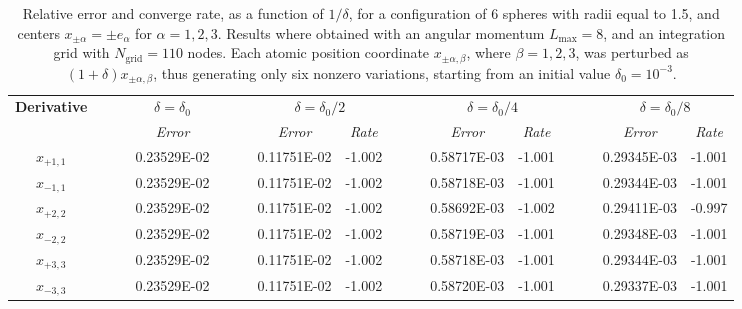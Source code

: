 \begin{table}[t]
\footnotesize
\begin{center}
	\begin{tabular}{ @{}cccc  cccc  cccc @{} }
\toprule[0.1em] 
\multirow{2}{*}{\bf Derivative} & $\phantom{abs}$ &  \multicolumn{1}{c}{$\delta = \delta_0$}& $\phantom{abs}$  & \multicolumn{2}{c}{$\delta = \delta_0/2$}& $\phantom{abs}$  & \multicolumn{2}{c}{$\delta = \delta_0/4$}& $\phantom{abs}$  & \multicolumn{2}{c}{$\delta = \delta_0/8$} \\
		         \cmidrule[0.05em]{3-3}  \cmidrule[0.05em](lr){5-6}  \cmidrule[0.05em]{8-9}   \cmidrule[0.05em]{11-12}
&	& {\sl Error}	&& {\sl Error}	& {\sl Rate} && {\sl Error}	& {\sl Rate}&& {\sl Error}	& {\sl Rate} \\
\midrule[0.05em]
$x_{+1,1}$ &  &  0.23529E-02  &  &    0.11751E-02  &  -1.002  &&  0.58717E-03  &  -1.001  &&  0.29345E-03  &  -1.001  \\
$x_ {-1,1}$  &&  0.23529E-02  &   &  0.11751E-02  &  -1.002  &&  0.58718E-03  &  -1.001  &&  0.29344E-03  &  -1.001  \\
$x_ {+2,2}$  &&  0.23529E-02  &   & 0.11751E-02  &  -1.002  &&  0.58692E-03  &  -1.002  &&  0.29411E-03  &  -0.997  \\
$x_ {-2,2}$  &&  0.23529E-02  &    &0.11751E-02  &  -1.002  &&  0.58719E-03  &  -1.001  &&  0.29348E-03  &  -1.001  \\
$x_ {+3,3}$  &&  0.23529E-02  &  &  0.11751E-02  &  -1.002  &&  0.58718E-03  &  -1.001  &&  0.29344E-03  &  -1.001  \\
$x_ {-3,3}$  &&  0.23529E-02  &   &  0.11751E-02  &  -1.002  &&  0.58720E-03  &  -1.001  &&  0.29337E-03  &  -1.001  \\
\bottomrule[0.1em]
\end{tabular}
\caption{Relative error and converge rate, as a function of $1/\delta$, for a configuration of 6 spheres with radii equal to 1.5, and centers $x_{\pm \alpha} =  \pm e_\alpha$ for $\alpha = 1, 2,3$.  Results where obtained with an angular momentum $L_\text{max} =  8$, and an integration grid with $N_\text{grid} = 110$ nodes. Each atomic position coordinate $x_{\pm\alpha,\beta}$, where $\beta = 1,2,3$, was perturbed as $(1 + \delta)x_{\pm\alpha , \beta}$, thus generating only six nonzero variations, starting from an initial value $\delta_0 = 10^{-3}$.}\label{tab:1}
\end{center}
\end{table}

